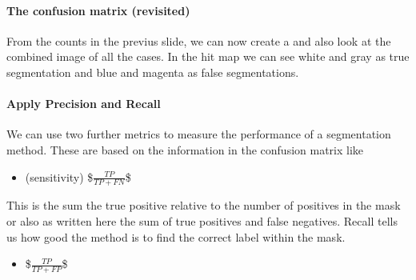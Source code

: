 \documentclass[letterpaper,10pt,english]{sphinxmanual}
\begin{document}
\paragraph{The confusion matrix (revisited)}
\label{\detokenize{04-BasicSegmentation_Part2:the-confusion-matrix-revisited}}
\sphinxAtStartPar
From the counts in the previus slide, we can now create a  and also look at the combined image of all the cases. In the hit map we can see white and gray as true segmentation and blue and magenta as false segmentations.

\begin{sphinxVerbatim}[commandchars=\\\{\}]
 
\end{sphinxVerbatim}

\noindent{}


\paragraph{Apply Precision and Recall}
\label{\detokenize{04-BasicSegmentation_Part2:apply-precision-and-recall}}
\sphinxAtStartPar
We can use two further metrics to measure the performance of a segmentation method. These are based on the information in the confusion matrix like
\begin{itemize}
\item {} 
\sphinxAtStartPar
{} (sensitivity)  \$\(\frac{TP}{TP+FN}\)\$

\end{itemize}

\sphinxAtStartPar
This is the sum the true positive relative to the number of positives in the mask or also as written here the sum of true positives and false negatives. Recall tells us how good the method is to find the correct label within the mask.
\begin{itemize}
\item {} 
\sphinxAtStartPar
{}            \$\(\frac{TP}{TP+FP}\)\$

\end{itemize}
\end{document}
